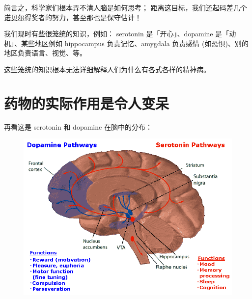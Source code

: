 \documentclass[12pt]{report}
\newcommand{\cc}[2]{#1}
\newcommand{\cc}[2]{#2}
\begin{document}
{\cc{
简言之，科学家们根本弄不清人脑是如何思考； 距离这目标，我们还起码差几个\uline{诺贝尔}得奖者的努力，甚至那也是保守估计！
}{
In short, neuroscientists do not yet know how the brain thinks and feels.  We are at least \textbf{several Nobel-prize} winners away from achieving this goal, and even that might be a conservative estimate!
}

\cc{
我们现时有些很笼统的知识，例如： serotonin 是「开心」、dopamine 是「动机」、某些地区例如 hippocampus 负责记忆、amygdala 负责感情 (如恐惧)、别的地区负责语言、视觉、等。
}{
What we do know now, is very \textit{crude} knowledge about the brain, for example:  that serotonin is somehow related to ``happiness'', that dopamine is somehow related to ``motivations'', that certain brain regions such as the hippocampus is responsible for ``memory'', the amygdala is somewhat responsible for ``emotions'' (such as fear), and some brain areas are somewhat related to ``language'', ``vision'', etc.
}

\cc{
这些笼统的知识根本无法详细解释人们为什么有各式各样的精神病。
}{
Such crude knowledge is far from able to explain why humans suffer from various forms of mental illness.
}

\section{\cc{药物的实际作用是令人变呆}{Psychiatric drugs make people dumb}}

\cc{
再看这是 serotonin 和 dopamine 在脑中的分布：
}{
Now look at the distribution of \textbf{serotonin} and \textbf{dopamine} in the bran:
}
\begin{figure}[H]
\centering
\includegraphics[scale=0.4]{dopamine_serotonin.png}
\end{figure}

}
\end{document}

